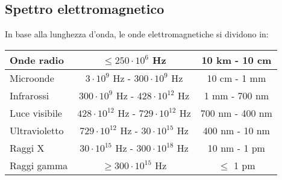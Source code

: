 \documentclass[a4paper]{article}
\begin{document}
\subsection{Spettro elettromagnetico}
In base alla lunghezza d'onda, le onde elettromagnetiche si dividono in:
\begin{center}
	\begin{tabular}{l | c | c}
		\toprule
		Onde radio & \(\leq 250 \cdot 10^6\) Hz & 10 km - 10 cm \\
		\midrule
		Microonde & \(3 \cdot 10^9\) Hz - \(300 \cdot 10^9\) Hz & 10 cm - 1 mm \\
		\midrule
		Infrarossi & \(300 \cdot 10^9\) Hz - \(428 \cdot 10^{12}\) Hz & 1 mm - 700 nm \\
		\midrule
		Luce visibile & \(428 \cdot 10^{12}\) Hz - \(729\cdot 10^{12}\) Hz & 700 nm - 400 nm \\
		\midrule
		Ultravioletto & \(729\cdot 10^{12}\) Hz - \(30 \cdot 10^{15}\) Hz & 400 nm - 10 nm \\
		\midrule
		Raggi X & \(30 \cdot 10^{15}\) Hz - \(300 \cdot 10^{18}\) Hz & 10 nm - 1 pm \\
		\midrule
		Raggi gamma & \(\geq 300 \cdot 10^{15}\) Hz & \(\leq\) 1 pm \\
		\bottomrule
	\end{tabular}
\end{center}
\end{document}
